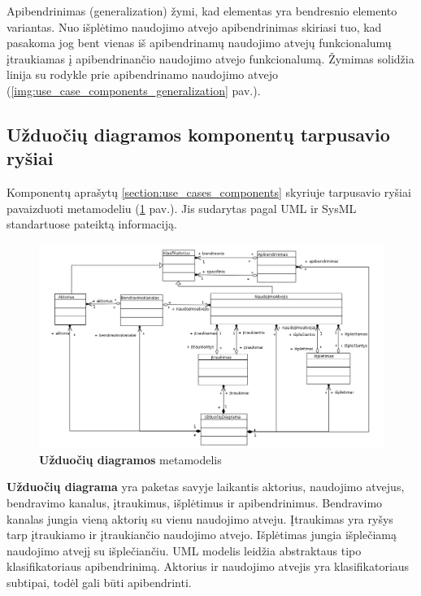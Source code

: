 Apibendrinimas (generalization) žymi, kad elementas yra bendresnio elemento variantas. Nuo išplėtimo naudojimo atvejo apibendrinimas skiriasi tuo, kad pasakoma jog bent vienas iš apibendrinamų naudojimo atvejų funkcionalumų įtraukiamas į apibendrinančio naudojimo atvejo funkcionalumą. Žymimas solidžia linija su rodykle prie apibendrinamo naudojimo atvejo (\ref{img:use_case_components_generalization} pav.).

\subsection{ \textbf{Užduočių diagramos} komponentų tarpusavio ryšiai}

Komponentų aprašytų \ref{section:use_cases_components} skyriuje tarpusavio ryšiai  pavaizduoti metamodeliu (\ref{img:use_cases_metamodel} pav.). Jis sudarytas pagal UML ir SysML standartuose pateiktą informaciją. 

\begin{figure}
	\centering
	\includegraphics[width=\textwidth]{img/use_cases_metamodel}
	\caption{\textbf{Užduočių diagramos} metamodelis}
	\label{img:use_cases_metamodel}
\end{figure} 

\textbf{Užduočių diagrama} yra paketas savyje laikantis aktorius, naudojimo atvejus, bendravimo kanalus, įtraukimus, išplėtimus ir apibendrinimus. Bendravimo kanalas jungia vieną aktorių su vienu naudojimo atveju. Įtraukimas yra ryšys tarp įtraukiamo ir įtraukiančio naudojimo atvejo. Išplėtimas jungia išplečiamą naudojimo atvejį su išplečiančiu. UML modelis leidžia abstraktaus tipo klasifikatoriaus apibendrinimą. Aktorius ir naudojimo atvejis yra klasifikatoriaus subtipai, todėl gali būti apibendrinti.

